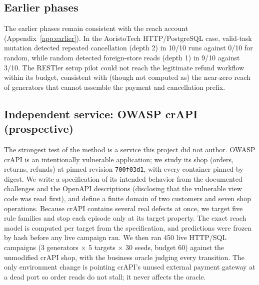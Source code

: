 \documentclass[conference]{IEEEtran}
\begin{document}
\subsection{Earlier phases}
The earlier phases remain consistent with the reach account (Appendix~\ref{app:earlier}).
In the AoristoTech HTTP/PostgreSQL case, valid-task mutation detected repeated
cancellation (depth 2) in 10/10 runs against 0/10 for random, while random detected
foreign-store reads (depth 1) in 9/10 against 3/10. The RESTler setup pilot could not
reach the legitimate refund workflow within its budget, consistent with (though not
computed as) the near-zero reach of generators that cannot assemble the payment and
cancellation prefix.

\subsection{Independent service: OWASP crAPI (prospective)}
\label{sec:crapi}
The strongest test of the method is a service this project did not author. OWASP crAPI is
an intentionally vulnerable application; we study its shop (orders, returns, refunds) at
pinned revision \texttt{700f03d1}, with every container pinned by digest. We write a
specification of its intended behavior from the documented challenges and the OpenAPI
descriptions (disclosing that the vulnerable view code was read first), and define a
finite domain of two customers and seven shop operations. Because crAPI contains several
real defects at once, we target five rule families and stop each episode only at its
target property. The exact reach model is computed per target from the specification, and
predictions were frozen by hash before any live campaign ran. We then ran 450 live
HTTP/SQL campaigns (3 generators $\times$ 5 targets $\times$ 30 seeds, budget 60) against
the unmodified crAPI shop, with the business oracle judging every transition. The only
environment change is pointing crAPI's unused external payment gateway at a dead port so
order reads do not stall; it never affects the oracle.
\end{document}
